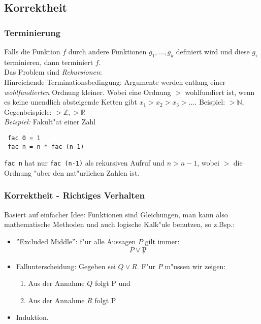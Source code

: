 \documentclass[german,10pt, a4paper, twocolumn]{scrartcl}
\theoremstyle{definition}
\theoremstyle{remark}
\begin{document}
\subsection{Korrektheit}

\subsubsection{Terminierung}

Falls die Funktion $f$ durch andere Funktionen $g_1,\ldots,g_k$ definiert wird und diese $g_i$ terminieren, dann terminiert $f$.\\

Das Problem sind \textit{Rekursionen}:\\
Hinreichende Terminationsbedingung: Argumente werden entlang einer \textit{wohlfundierten} Ordnung kleiner. Wobei eine Ordnung $>$ wohlfundiert ist, wenn es keine unendlich absteigende Ketten gibt $x_1>x_2>x_3>\ldots$. Beispiel: $>\mathbb{N}$, Gegenbeispiele: $>\mathbb{Z},>\mathbb{R}$\\

\textit{Beispiel:} Fakult"at einer Zahl
\begin{verbatim}
 fac 0 = 1
 fac n = n * fac (n-1)
\end{verbatim}

\verb#fac n# hat nur \verb#fac (n-1)# als rekursiven Aufruf und $n>n-1$, wobei $>$ die Ordnung "uber den nat"urlichen Zahlen ist.

\subsubsection{Korrektheit - Richtiges Verhalten}

Basiert auf einfacher Idee: Funktionen sind Gleichungen, man kann also mathematische Methoden und auch logische Kalk"ule benutzen, so z.Bsp.:
\begin{itemize}
	\item''Excluded Middle'': f"ur alle Aussagen $P$ gilt immer:
		\begin{displaymath}
			P \lor\not P
		\end{displaymath}
	\item Fallunterscheidung: Gegeben sei $Q \lor R$. F"ur $P$ m"ussen wir zeigen:
		\begin{enumerate}
			\item Aus der Annahme $Q$ folgt P und
			\item Aus der Annahme $R$ folgt P
		\end{enumerate}
	\item Induktion.
\end{itemize}
\end{document}
